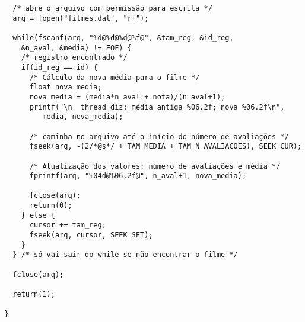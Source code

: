 \documentclass[11pt,twoside]{article}
\begin{document}
\begin{verbatim}
  /* abre o arquivo com permissão para escrita */
  arq = fopen("filmes.dat", "r+");

  while(fscanf(arq, "%d@%d@%d@%f@", &tam_reg, &id_reg, 
    &n_aval, &media) != EOF) {
    /* registro encontrado */
    if(id_reg == id) {
      /* Cálculo da nova média para o filme */
      float nova_media;
      nova_media = (media*n_aval + nota)/(n_aval+1);
      printf("\n  thread diz: média antiga %06.2f; nova %06.2f\n",
         media, nova_media);
      
      /* caminha no arquivo até o início do número de avaliações */
      fseek(arq, -(2/*@s*/ + TAM_MEDIA + TAM_N_AVALIACOES), SEEK_CUR);

      /* Atualização dos valores: número de avaliações e média */
      fprintf(arq, "%04d@%06.2f@", n_aval+1, nova_media);

      fclose(arq);
      return(0);
    } else {
      cursor += tam_reg;
      fseek(arq, cursor, SEEK_SET);
    }
  } /* só vai sair do while se não encontrar o filme */
  
  fclose(arq);
  
  return(1);

}
\end{verbatim}


\end{document}
